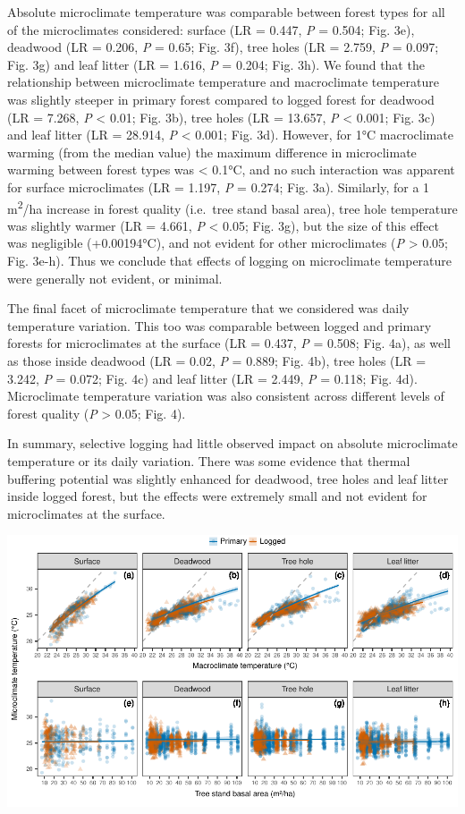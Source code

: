 \documentclass[12pt,a4paper,]{report}
\theoremstyle{definition}
\theoremstyle{definition}
\theoremstyle{definition}
\theoremstyle{remark}
\begin{document}
Absolute microclimate temperature was comparable between forest types
for all of the microclimates considered: surface (LR = 0.447, \emph{P} =
0.504; Fig. 3e), deadwood (LR = 0.206, \emph{P} = 0.65; Fig. 3f), tree
holes (LR = 2.759, \emph{P} = 0.097; Fig. 3g) and leaf litter (LR =
1.616, \emph{P} = 0.204; Fig. 3h). We found that the relationship
between microclimate temperature and macroclimate temperature was
slightly steeper in primary forest compared to logged forest for
deadwood (LR = 7.268, \emph{P} \textless{} 0.01; Fig. 3b), tree holes
(LR = 13.657, \emph{P} \textless{} 0.001; Fig. 3c) and leaf litter (LR =
28.914, \emph{P} \textless{} 0.001; Fig. 3d). However, for 1°C
macroclimate warming (from the median value) the maximum difference in
microclimate warming between forest types was \textless{} 0.1°C, and no
such interaction was apparent for surface microclimates (LR = 1.197,
\emph{P} = 0.274; Fig. 3a). Similarly, for a 1 m\textsuperscript{2}/ha
increase in forest quality (i.e.~tree stand basal area), tree hole
temperature was slightly warmer (LR = 4.661, \emph{P} \textless{} 0.05;
Fig. 3g), but the size of this effect was negligible (+0.00194°C), and
not evident for other microclimates (\emph{P} \textgreater{} 0.05; Fig.
3e-h). Thus we conclude that effects of logging on microclimate
temperature were generally not evident, or minimal.

The final facet of microclimate temperature that we considered was daily
temperature variation. This too was comparable between logged and
primary forests for microclimates at the surface (LR = 0.437, \emph{P} =
0.508; Fig. 4a), as well as those inside deadwood (LR = 0.02, \emph{P} =
0.889; Fig. 4b), tree holes (LR = 3.242, \emph{P} = 0.072; Fig. 4c) and
leaf litter (LR = 2.449, \emph{P} = 0.118; Fig. 4d). Microclimate
temperature variation was also consistent across different levels of
forest quality (\emph{P} \textgreater{} 0.05; Fig. 4).

In summary, selective logging had little observed impact on absolute
microclimate temperature or its daily variation. There was some evidence
that thermal buffering potential was slightly enhanced for deadwood,
tree holes and leaf litter inside logged forest, but the effects were
extremely small and not evident for microclimates at the surface.

\begin{center}\includegraphics{./output/fig-4-3-1} \end{center}
\end{document}
